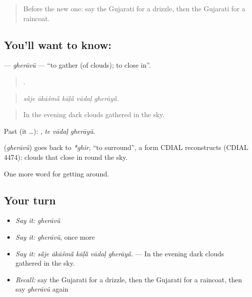 \label{lesson:GU-C434-gheravu}



\begin{quote}
Before the new one: say the Gujarati for a drizzle, then the Gujarati for a raincoat.
\end{quote}

\subsection*{You'll want to know: }
\textbf{} — \emph{gherāvũ} — \textquotedblleft{}to gather (of clouds); to close in\textquotedblright{}.

\begin{quote}
    .
\end{quote}

\begin{quote}
\emph{sā̃je ākāśmā̃ kāḷā̃ vādaḷ gherāyā̃.}
\end{quote}

\begin{quote}
In the evening dark clouds gathered in the sky.
\end{quote}

Past (it …):   , \emph{te vādaḷ gherāyũ}.

\begin{cousinweb}
\textbf{} (\emph{gherāvũ}) goes back to \emph{*ghir}, \textquotedblleft{}to surround\textquotedblright{}, a form CDIAL reconstructs (CDIAL 4474): clouds that close in round the sky.
\end{cousinweb}

\begin{grammarlens}[title={What you've built}]
One more word for getting around.
\end{grammarlens}

\subsection*{Your turn}
\begin{itemize}
\raggedright
  \item \emph{Say it:} \emph{gherāvũ}
  \item \emph{Say it:} \emph{gherāvũ}, once more
  \item \emph{Say it:} \emph{sā̃je ākāśmā̃ kāḷā̃ vādaḷ gherāyā̃.} — In the evening dark clouds gathered in the sky.
  \item \emph{Recall:} say the Gujarati for a drizzle, then the Gujarati for a raincoat, then say \emph{gherāvũ} again
\end{itemize}


